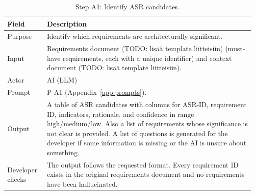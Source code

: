\begin{table}[!htbp]
	\caption{Step A1: Identify ASR candidates.}
	\label{tab:step_A1}
	\begin{tabularx}{\textwidth}{l X}
		\toprule
		\textbf{Field}      & \textbf{Description}                                                                                                                                                                                                                                                                                                               \\
		\midrule
		Purpose             & Identify which requirements are architecturally significant.                                                                                                                                                                                                                                                                       \\
		Input               & Requirements document (TODO: lisää template liitteisiin) (must-have requirements, each with a unique identifier) and context document (TODO: lisää template liitteisiin).                                                                                                                                                          \\
		Actor               & AI (LLM)                                                                                                                                                                                                                                                                                                                           \\
		Prompt              & P-A1 (Appendix~\ref{app:prompts}).                                                                                                                                                                                                                                                                                                 \\
		Output              & A table of ASR candidates with columns for ASR-ID, requirement ID, indicators, rationale, and confidence in range high/medium/low. Also a list of requirements whose significance is not clear is provided. A list of questions is generated for the developer if some information is missing or the AI is unsure about something. \\
		Developer checks    & The output follows the requested format. Every requirement ID exists in the original requirements document and no requirements have been hallucinated.                                                                                                                                                                             \\

\end{tabularx}
\end{table}

